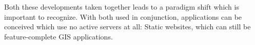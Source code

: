 
Both these developments taken together leads to a paradigm shift which is important to recognize.
With both used in conjunction, applications can be conceived which use no active servers at all: Static websites, which can still be feature-complete \ac{GIS} applications.












